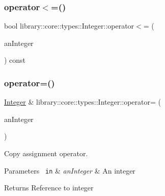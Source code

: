 \subsubsection{\texorpdfstring{operator$<$=()}{operator<=()}\hspace{0.1cm}{\footnotesize\ttfamily [2/2]}}
{\footnotesize\ttfamily bool library\+::core\+::types\+::\+Integer\+::operator$<$= (\begin{DoxyParamCaption}\item[{const \mbox{\hyperlink{classlibrary_1_1core_1_1types_1_1_integer_a623afb1580f870fd8a1997b1c12c917d}{Integer\+::\+Value\+Type}} \&}]{an\+Integer }\end{DoxyParamCaption}) const}

\mbox{\label{classlibrary_1_1core_1_1types_1_1_integer_ab77cae94a9e6d4a405a555dd55763ea2}} 
\subsubsection{\texorpdfstring{operator=()}{operator=()}}
{\footnotesize\ttfamily \mbox{\hyperlink{classlibrary_1_1core_1_1types_1_1_integer}{Integer}} \& library\+::core\+::types\+::\+Integer\+::operator= (\begin{DoxyParamCaption}\item[{\mbox{\hyperlink{classlibrary_1_1core_1_1types_1_1_integer_a623afb1580f870fd8a1997b1c12c917d}{Integer\+::\+Value\+Type}}}]{an\+Integer }\end{DoxyParamCaption})}



Copy assignment operator. 


\begin{DoxyParams}[1]{Parameters}
\mbox{\texttt{ in}}  & {\em an\+Integer} & An integer \\
\hline
\end{DoxyParams}
\begin{DoxyReturn}{Returns}
Reference to integer 
\end{DoxyReturn}
\mbox{\label{classlibrary_1_1core_1_1types_1_1_integer_a52b3a012d6c6779773d051800daac516}} 
